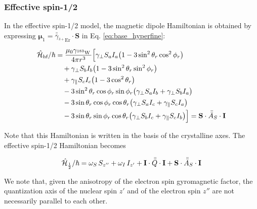 \subsubsection{Effective spin-1/2} 


In the effective spin-1/2 model, the magnetic dipole Hamiltonian is obtained by expressing $\boldsymbol{\mu}_1 = \bar{\bar{\gamma}}_{^{3+}\text{Er}} \cdot \mathbf{S}$ in Eq. \ref{eq:base_hyperfine}:


\begin{equation}
\begin{aligned}
\hat{\mathcal{H}}_{\text{hf}} / \hbar &= 
\frac{\mu_0 \gamma_\text{$^{183}$W\,}}{4\pi r^3} \Big[ 
\gamma_{\perp} S_{a} I_{a} \big( 1 - 3 \sin^2 \theta_r \cos^2 \phi_r \big) \\
&\quad + \gamma_{\perp} S_{b} I_{b} \big( 1 - 3 \sin^2 \theta_r \sin^2 \phi_r \big) \\
&\quad + \gamma_{\parallel} S_{c} I_{c} \big( 1 - 3 \cos^2 \theta_r \big) \\
&\quad - 3 \sin^2 \theta_r \cos \phi_r \sin \phi_r 
\big( \gamma_{\perp} S_{a} I_{b} + \gamma_{\perp} S_{b} I_{a} \big) \\
&\quad - 3 \sin \theta_r \cos \phi_r \cos \theta_r 
\big( \gamma_{\perp} S_{a} I_{c} + \gamma_{\parallel} S_{c} I_{a} \big) \\
&\quad - 3 \sin \theta_r \sin \phi_r \cos \theta_r 
\big( \gamma_{\perp} S_{b} I_{c} + \gamma_{\parallel} S_{c} I_{b} \big) 
\Big] = \mathbf{S} \cdot \bar{\bar {A}}_{S} \cdot \mathbf{I}
\label{eq:half_hyperfine}
\end{aligned}
\end{equation}

Note that this Hamiltonian is written in the basis of the crystalline axes. The effective spin-1/2 Hamiltonian becomes
    
\begin{equation}
    \hat{\mathcal{H}}_{\text{$\tfrac12$}} / \hbar = \omega_S \, S_{z''} + \omega_I \, I_{z'} + \mathbf{I} \cdot \bar{\bar{Q}} \cdot \mathbf{I} + \mathbf{S} \cdot \bar{\bar {A}}_{S} \cdot \mathbf{I}
    \label{eq:spin_half_hamiltonian}
\end{equation}

We note that, given the anisotropy of the electron spin gyromagnetic factor, the quantization axis of the nuclear spin $z'$ and of the electron spin $z''$ are not necessarily parallel to each other.

